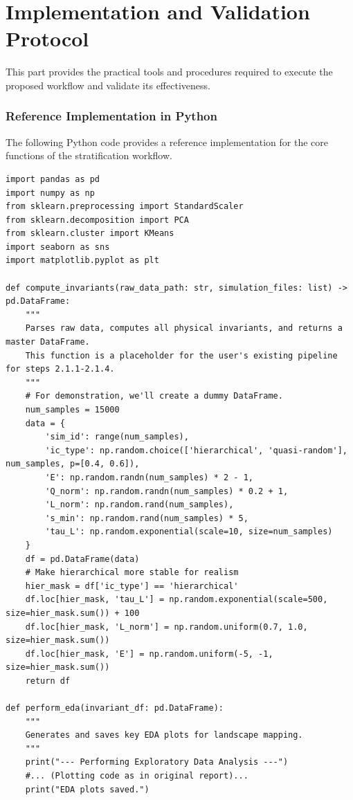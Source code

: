 \part{Implementation and Validation Protocol}

This part provides the practical tools and procedures required to execute the proposed workflow and validate its effectiveness.

\section{Reference Implementation in Python}

The following Python code provides a reference implementation for the core functions of the stratification workflow.

\begin{lstlisting}
import pandas as pd
import numpy as np
from sklearn.preprocessing import StandardScaler
from sklearn.decomposition import PCA
from sklearn.cluster import KMeans
import seaborn as sns
import matplotlib.pyplot as plt

def compute_invariants(raw_data_path: str, simulation_files: list) -> pd.DataFrame:
    """
    Parses raw data, computes all physical invariants, and returns a master DataFrame.
    This function is a placeholder for the user's existing pipeline for steps 2.1.1-2.1.4.
    """
    # For demonstration, we'll create a dummy DataFrame.
    num_samples = 15000
    data = {
        'sim_id': range(num_samples),
        'ic_type': np.random.choice(['hierarchical', 'quasi-random'], num_samples, p=[0.4, 0.6]),
        'E': np.random.randn(num_samples) * 2 - 1,
        'Q_norm': np.random.randn(num_samples) * 0.2 + 1,
        'L_norm': np.random.rand(num_samples),
        's_min': np.random.rand(num_samples) * 5,
        'tau_L': np.random.exponential(scale=10, size=num_samples)
    }
    df = pd.DataFrame(data)
    # Make hierarchical more stable for realism
    hier_mask = df['ic_type'] == 'hierarchical'
    df.loc[hier_mask, 'tau_L'] = np.random.exponential(scale=500, size=hier_mask.sum()) + 100
    df.loc[hier_mask, 'L_norm'] = np.random.uniform(0.7, 1.0, size=hier_mask.sum())
    df.loc[hier_mask, 'E'] = np.random.uniform(-5, -1, size=hier_mask.sum())
    return df

def perform_eda(invariant_df: pd.DataFrame):
    """
    Generates and saves key EDA plots for landscape mapping.
    """
    print("--- Performing Exploratory Data Analysis ---")
    #... (Plotting code as in original report)...
    print("EDA plots saved.")


\end{lstlisting}
